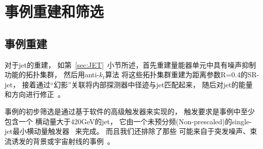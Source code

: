 \section{事例重建和筛选}
\label{sec:DijetSelection}



\subsection{事例重建}
\label{sec:DijetSelection1}

对于jet的重建，
如第~\ref{sec:JET}~小节所述，首先重建量能器单元中具有噪声抑制功能的拓扑集群，
然后用anti-$k_t$算法
将这些拓扑集群重建为距离参数R=0.4的SR-jet，
接着通过“幻影”关联将内部探测器中径迹与jet匹配起来，
随后对jet的能量和方向进行修正~\cite{PERF-2016-04}。

事例的初步筛选是通过基于软件的高级触发器来实现的，
触发要求是事例中至少包含一个
横动量大于420GeV的jet，
它由一个未预分频(Non-prescaled)的single-jet最小横动量触发器~\cite{ATLASRTS}
来完成。
而且我们还排除了那些
可能来自于突发噪声、束流诱发的背景或宇宙射线的事例~\cite{ATLAS-CONF-2015-029}。




